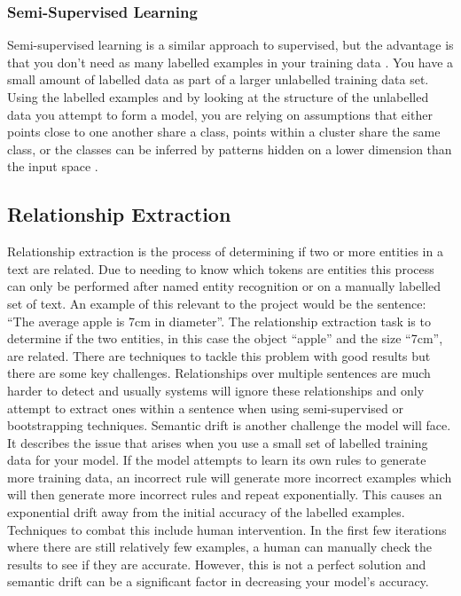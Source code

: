 \documentclass[11pt,oneside]{book}
\begin{document}
\subsubsection{Semi-Supervised Learning}

Semi-supervised learning is a similar approach to supervised, but the advantage is that you don’t need as many labelled examples in your training data \citep{intro_to_semi}. You have a small amount of labelled data as part of a larger unlabelled training data set. Using the labelled examples and by looking at the structure of the unlabelled data you attempt to form a model, you are relying on assumptions that either points close to one another share a class, points within a cluster share the same class, or the classes can be inferred by patterns hidden on a lower dimension than the input space \citep{semi-supervised_learning}.

\subsection{Relationship Extraction}

Relationship extraction is the process of determining if two or more entities in a text are related. Due to needing to know which tokens are entities this process can only be performed after named entity recognition or on a manually labelled set of text. An example of this relevant to the project would be the sentence: “The average apple is 7cm in diameter”. The relationship extraction task is to determine if the two entities, in this case the object “apple” and the size “7cm”, are related. There are techniques to tackle this problem with good results but there are some key challenges. Relationships over multiple sentences are much harder to detect and usually systems will ignore these relationships and only attempt to extract ones within a sentence when using semi-supervised or bootstrapping techniques. Semantic drift is another challenge the model will face. It describes the issue that arises when you use a small set of labelled training data for your model. If the model attempts to learn its own rules to generate more training data, an incorrect rule will generate more incorrect examples which will then generate more incorrect rules and repeat exponentially. This causes an exponential drift away from the initial accuracy of the labelled examples. Techniques to combat this include human intervention. In the first few iterations where there are still relatively few examples, a human can manually check the results to see if they are accurate. However, this is not a perfect solution and semantic drift can be a significant factor in decreasing your model’s accuracy.
\end{document}
